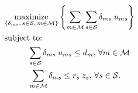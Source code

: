 \documentclass[conference]{IEEEtran}
\begin{document}
\begin{tcolorbox}[floatplacement = !ht, float, title = Adaptive Slicing Model]
\begin{align}
& \underset{\left\{ \substack{
	\delta_{ms},\,	s \in \mathcal{S},\, m \in \mathcal{M}} \right\}} {\text{maximize}}
\left\{ \sum_{m \in \mathcal{M}} \sum_{s \in \mathcal{S}} \delta_{ms} \; u_{ms} \right\} \nonumber \\
& \text{subject to:}  \nonumber \\
& \hspace{0.4in} \sum_{s \in \mathcal{S}} \delta_{ms} \; u_{ms} \leq d_m,\, \forall m \in \mathcal{M} \nonumber \\
& \hspace{0.4in} \sum_{m \in \mathcal{M}} \delta_{ms} \leq r_s \; z_s,\, \forall s \in \mathcal{S}. \nonumber
\end{align}
\end{tcolorbox}





%
%
%





\end{document}

